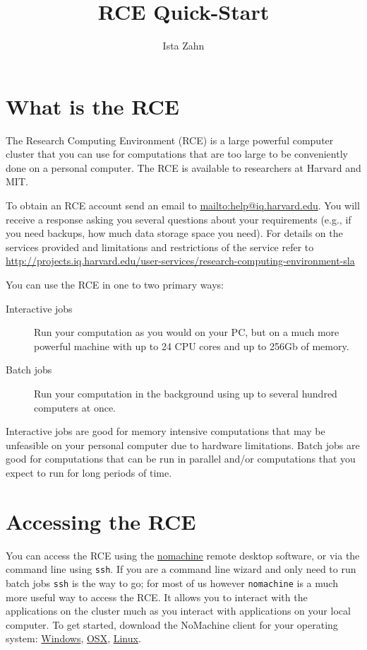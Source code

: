 \documentclass[11pt]{article}
\author{Ista Zahn}
\date{}
\title{RCE Quick-Start}
\begin{document}
\maketitle
\tableofcontents


\section{What is the RCE}
\label{sec-1}
The Research Computing Environment (RCE) is a large powerful computer cluster that you can use for computations that are too large to be conveniently done on a personal computer. The RCE is available to researchers at Harvard and MIT. 

To obtain an RCE account send an email to \url{mailto:help@iq.harvard.edu}. You will receive a response asking you several questions about your requirements (e.g., if you need backups, how much data storage space you need). For details on the services provided and limitations and restrictions of the service refer to \url{http://projects.iq.harvard.edu/user-services/research-computing-environment-sla}

You can use the RCE in one to two primary ways:
\begin{description}
\item[{Interactive jobs}] Run your computation as you would on your PC, but on a much more powerful machine with up to 24 CPU cores and up to 256Gb of memory.
\item[{Batch jobs}] Run your computation in the background using up to several hundred computers at once.
\end{description}

Interactive jobs are good for memory intensive computations that may be unfeasible on your personal computer due to hardware limitations. Batch jobs are good for computations that can be run in parallel and/or computations that you expect to run for long periods of time.


\section{Accessing the RCE}
\label{sec-2}
You can access the RCE using the \href{http://projects.iq.harvard.edu/rce/nx4_installation}{nomachine} remote desktop software, or via the command line using \texttt{ssh}. If you are a command line wizard and only need to run batch jobs \texttt{ssh} is the way to go; for most of us however \texttt{nomachine} is a much more useful way to access the RCE. It allows you to interact with the applications on the cluster much as you interact with applications on your local computer. To get started, download the NoMachine client for your operating system: \href{http://downloads.hmdc.harvard.edu/nx/4/nomachine-client-windows-latest.zip}{Windows}, \href{http://downloads.hmdc.harvard.edu/nx/4/nomachine-client-osx-latest.dmg}{OSX}, \href{http://downloads.hmdc.harvard.edu/nx/4/nomachine-client-linux-latest.zip}{Linux}. 
\end{document}
